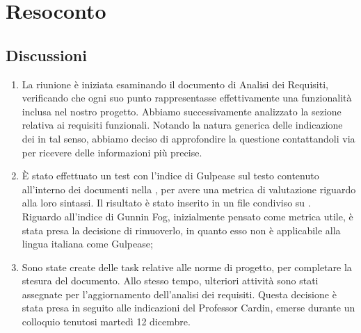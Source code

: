 \section{Resoconto} \label{sec:resoconto}
\subsection{Discussioni} \label{subsec:resdiscussione}
\begin{enumerate}
    \item  La riunione è iniziata esaminando il documento di Analisi dei Requisiti, verificando che ogni suo punto rappresentasse effettivamente una funzionalità inclusa nel nostro progetto. Abbiamo successivamente analizzato la sezione relativa ai requisiti funzionali. Notando la natura generica delle indicazione dei  in tal senso, abbiamo deciso di approfondire la questione contattandoli via  per ricevere delle informazioni più precise.
    
    \item È stato effettuato un test con l'indice di Gulpease sul testo contenuto all'interno dei documenti nella , per avere una metrica di valutazione riguardo alla loro sintassi. Il risultato è stato inserito in un file condiviso su . \\
    Riguardo all'indice di Gunnin Fog, inizialmente pensato come metrica utile, è stata presa la decisione di rimuoverlo, in quanto esso non è applicabile alla lingua italiana come Gulpease;

    \item Sono state create delle task relative alle norme di progetto, per completare la stesura del documento. Allo stesso tempo, ulteriori attività sono stati assegnate per l'aggiornamento dell'analisi dei requisiti. Questa decisione è stata presa in seguito alle indicazioni del Professor Cardin, emerse durante un colloquio tenutosi martedì 12 dicembre.
    
\end{enumerate}

